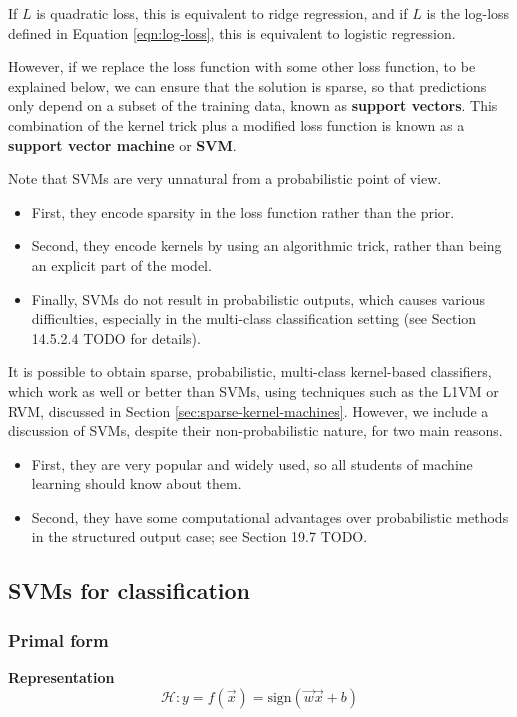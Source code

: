 If $L$ is quadratic loss, this is equivalent to ridge regression, and if $L$ is the log-loss defined in Equation \eqref{eqn:log-loss}, this is equivalent to logistic regression.

However, if we replace the loss function with some other loss function, to be explained below, we can ensure that the solution is sparse, so that predictions only depend on a subset of the training data, known as \textbf{support vectors}. This combination of the kernel trick plus a modified loss function is known as a \textbf{support vector machine} or \textbf{SVM}. 

Note that SVMs are very unnatural from a probabilistic point of view. 
\begin{itemize}
\item{First, they encode sparsity in the loss function rather than the prior.}
\item{Second, they encode kernels by using an algorithmic trick, rather than being an explicit part of the model. }
\item{Finally, SVMs do not result in probabilistic outputs, which causes various difficulties, especially in the multi-class classification setting (see Section 14.5.2.4 TODO for details).}
\end{itemize}

It is possible to obtain sparse, probabilistic, multi-class kernel-based classifiers, which work as well or better than SVMs, using techniques such as the L1VM or RVM, discussed in Section \ref{sec:sparse-kernel-machines}. However, we include a discussion of SVMs, despite their non-probabilistic nature, for two main reasons. 
\begin{itemize}
\item{First, they are very popular and widely used, so all students of machine learning should know about them.}
\item{Second, they have some computational advantages over probabilistic methods in the structured output case; see Section 19.7 TODO.}
\end{itemize}


\subsection{SVMs for classification}


\subsubsection{Primal form}
\textbf{Representation}
\begin{equation}
\mathcal{H}:y=f(\vec{x})=\text{sign}(\vec{w}\vec{x}+b)
\end{equation}

